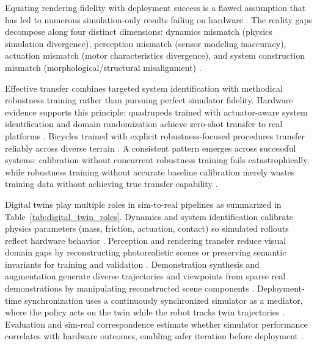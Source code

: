 \documentclass[12pt,a4paper,oneside]{report}
\begin{document}
Equating rendering fidelity with deployment success is a flawed assumption that has led to numerous simulation-only results failing on hardware \cite{aljalbout2026realitygap}. The reality gaps decompose along four distinct dimensions: dynamics mismatch (physics simulation divergence), perception mismatch (sensor modeling inaccuracy), actuation mismatch (motor characteristics divergence), and system construction mismatch (morphological/structural misalignment) \cite{aljalbout2026realitygap, tan2018simtoreal}.

Effective transfer combines targeted system identification with methodical robustness training rather than pursuing perfect simulator fidelity. Hardware evidence supports this principle: quadrupeds trained with actuator-aware system identification and domain randomization achieve zero-shot transfer to real platforms \cite{tan2018simtoreal}. Bicycles trained with explicit robustness-focused procedures transfer reliably across diverse terrain \cite{liu2024cyclerl}. A consistent pattern emerges across successful systems: calibration without concurrent robustness training fails catastrophically, while robustness training without accurate baseline calibration merely wastes training data without achieving true transfer capability \cite{tan2018simtoreal, aljalbout2026realitygap}.

Digital twins play multiple roles in sim-to-real pipelines as summarized in Table~\ref{tab:digital_twin_roles}. Dynamics and system identification calibrate physics parameters (mass, friction, actuation, contact) so simulated rollouts reflect hardware behavior \cite{tan2018simtoreal, heiden2022inferring, lou2026drex}. Perception and rendering transfer reduce visual domain gaps by reconstructing photorealistic scenes or preserving semantic invariants for training and validation \cite{qureshi2025splatsim, tang2025semantic}. Demonstration synthesis and augmentation generate diverse trajectories and viewpoints from sparse real demonstrations by manipulating reconstructed scene components \cite{yang2025robosplat, yu2025real2render2real}. Deployment-time synchronization uses a continuously synchronized simulator as a mediator, where the policy acts on the twin while the robot tracks twin trajectories \cite{abou2024realissim}. Evaluation and sim-real correspondence estimate whether simulator performance correlates with hardware outcomes, enabling safer iteration before deployment \cite{jain2025polaris, li2024simpler}.
\end{document}
